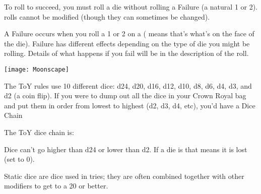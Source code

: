 {\cbreak\bump

To roll to succeed, you must roll a die without rolling a Failure (a natural 1 or 2).  \RS rolls cannot be modified (though they can sometimes be changed).  

A Failure occurs when you roll a  1 or 2 on a \RS ( means that's what's on the face of the die). Failure has different effects depending on the type of die you might be rolling.  Details of what happens if you fail will be in the description of the roll.

\begin{center}
\texttt{[image: Moonscape]}
\end{center}


\newpage

The ToY rules use 10 different dice: d24, d20, d16, d12, d10, d8, d6, d4, d3, and d2 (a coin flip).   If you were to dump out all the dice in your Crown Royal bag and put them in order from lowest to highest (d2, d3, d4, etc), you'd have a Dice Chain

The ToY dice chain is:
~\\


Dice can't go higher than d24 or lower than d2.  If a die is   that means it is lost (set to 0).


Static dice are dice used in \RO tries; they are often combined together with other modifiers to get to a 20 or better.

\cbreak\bump



}
